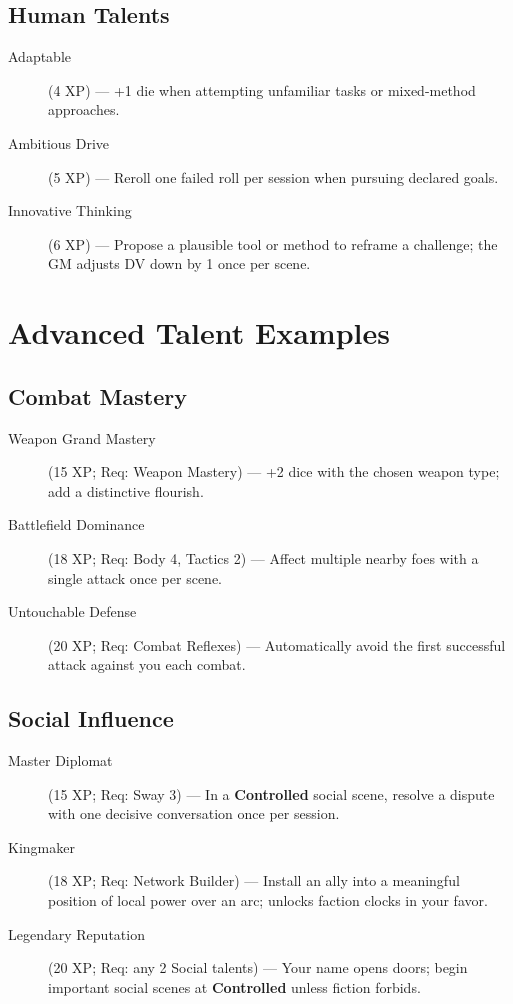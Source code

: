 \begin{multicols}{2}
\subsection*{Human Talents}
\begin{description}
\item[Adaptable] (4 XP) --- +1 die when attempting unfamiliar tasks or mixed-method approaches.
\item[Ambitious Drive] (5 XP) --- Reroll one failed roll per session when pursuing declared goals.
\item[Innovative Thinking] (6 XP) --- Propose a plausible tool or method to reframe a challenge; the GM adjusts DV down by 1 once per scene.
\end{description}

\section{Advanced Talent Examples}

\subsection*{Combat Mastery}
\begin{description}
\item[Weapon Grand Mastery] (15 XP; Req: Weapon Mastery) --- +2 dice with the chosen weapon type; add a distinctive flourish.
\item[Battlefield Dominance] (18 XP; Req: Body 4, Tactics 2) --- Affect multiple nearby foes with a single attack once per scene.
\item[Untouchable Defense] (20 XP; Req: Combat Reflexes) --- Automatically avoid the first successful attack against you each combat.
\end{description}

\subsection*{Social Influence}
\begin{description}
\item[Master Diplomat] (15 XP; Req: Sway 3) --- In a \textbf{Controlled} social scene, resolve a dispute with one decisive conversation once per session.
\item[Kingmaker] (18 XP; Req: Network Builder) --- Install an ally into a meaningful position of local power over an arc; unlocks faction clocks in your favor.
\item[Legendary Reputation] (20 XP; Req: any 2 Social talents) --- Your name opens doors; begin important social scenes at \textbf{Controlled} unless fiction forbids.
\end{description}


\end{multicols}

